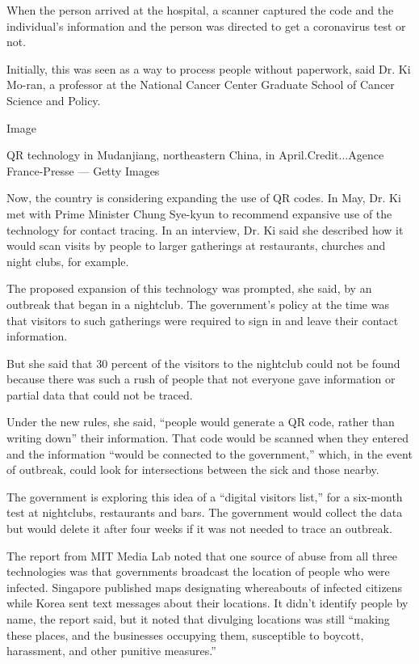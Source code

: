 When the person arrived at the hospital, a scanner captured the code and
the individual's information and the person was directed to get a
coronavirus test or not.

Initially, this was seen as a way to process people without paperwork,
said Dr. Ki Mo-ran, a professor at the National Cancer Center Graduate
School of Cancer Science and Policy.

Image

QR technology in Mudanjiang, northeastern China, in
April.Credit...Agence France-Presse --- Getty Images

Now, the country is considering expanding the use of QR codes. In May,
Dr. Ki met with Prime Minister Chung Sye-kyun to recommend expansive use
of the technology for contact tracing. In an interview, Dr. Ki said she
described how it would scan visits by people to larger gatherings at
restaurants, churches and night clubs, for example.

The proposed expansion of this technology was prompted, she said, by an
outbreak that began in a nightclub. The government's policy at the time
was that visitors to such gatherings were required to sign in and leave
their contact information.

But she said that 30 percent of the visitors to the nightclub could not
be found because there was such a rush of people that not everyone gave
information or partial data that could not be traced.

Under the new rules, she said, ``people would generate a QR code, rather
than writing down'' their information. That code would be scanned when
they entered and the information ``would be connected to the
government,'' which, in the event of outbreak, could look for
intersections between the sick and those nearby.

The government is exploring this idea of a ``digital visitors list,''
for a six-month test at nightclubs, restaurants and bars. The government
would collect the data but would delete it after four weeks if it was
not needed to trace an outbreak.

The report from MIT Media Lab noted that one source of abuse from all
three technologies was that governments broadcast the location of people
who were infected. Singapore published maps designating whereabouts of
infected citizens while Korea sent text messages about their locations.
It didn't identify people by name, the report said, but it noted that
divulging locations was still ``making these places, and the businesses
occupying them, susceptible to boycott, harassment, and other punitive
measures.''

